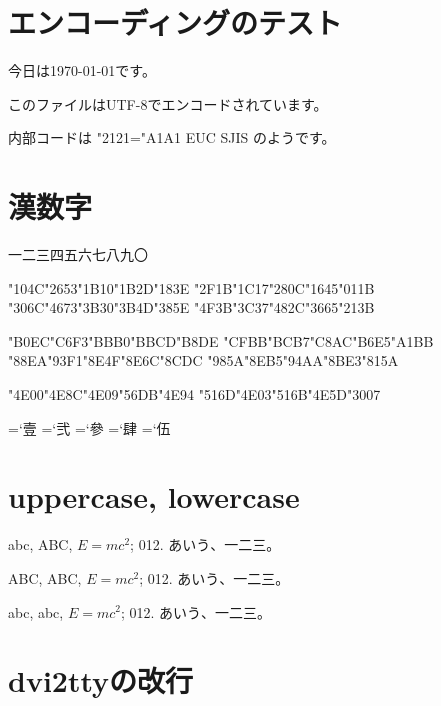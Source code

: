 \documentclass{jarticle}
\begin{document}
\section{エンコーディングのテスト}
今日は\today です。

このファイルはUTF-8でエンコードされています。

内部コードは
\ifnum\jis"2121="A1A1
 EUC%
\else
 SJIS%
\fi
のようです。


\section{漢数字}

\quad\quad
一二三四五六七八九〇

\char\kuten"104C\char\kuten"2653\char\kuten"1B10\char\kuten"1B2D\char\kuten"183E
\char\kuten"2F1B\char\kuten"1C17\char\kuten"280C\char\kuten"1645\char\kuten"011B
\quad\quad
\char\jis"306C\char\jis"4673\char\jis"3B30\char\jis"3B4D\char\jis"385E
\char\jis"4F3B\char\jis"3C37\char\jis"482C\char\jis"3665\char\jis"213B

\char\euc"B0EC\char\euc"C6F3\char\euc"BBB0\char\euc"BBCD\char\euc"B8DE
\char\euc"CFBB\char\euc"BCB7\char\euc"C8AC\char\euc"B6E5\char\euc"A1BB
\quad\quad
\char\sjis"88EA\char\sjis"93F1\char\sjis"8E4F\char\sjis"8E6C\char\sjis"8CDC
\char\sjis"985A\char\sjis"8EB5\char\sjis"94AA\char\sjis"8BE3\char\sjis"815A

\makeatletter
\ifx\ucs\@undefined
\else
  \char\ucs"4E00\char\ucs"4E8C\char\ucs"4E09\char\ucs"56DB\char\ucs"4E94
  \char\ucs"516D\char\ucs"4E03\char\ucs"516B\char\ucs"4E5D\char\ucs"3007
\fi
\makeatother

=`壹
=`弐
=`參
=`肆
=`伍

\section{uppercase, lowercase}

abc, ABC, $E=mc^2$; 012. あいう、一二三。

\uppercase{abc, ABC, $E=mc^2$; 012. あいう、一二三。}

\lowercase{abc, ABC, $E=mc^2$; 012. あいう、一二三。}

\section{dvi2ttyの改行}
\parindent 0mm
\end{document}
